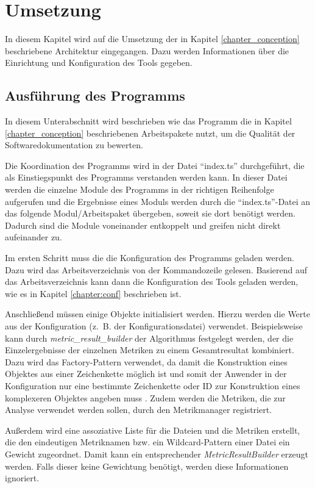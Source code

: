 \chapter{Umsetzung}\label{chapter:program}
In diesem Kapitel wird auf die Umsetzung der in Kapitel \ref{chapter_conception} beschriebene Architektur eingegangen. Dazu werden Informationen über die Einrichtung und Konfiguration des Tools gegeben.
\section{Ausführung des Programms}
In diesem Unterabschnitt wird beschrieben wie das Programm die in Kapitel \ref{chapter_conception}
beschriebenen Arbeitspakete nutzt, um die Qualität der Softwaredokumentation zu bewerten. 

Die Koordination des Programms wird in der Datei \enquote{index.ts} durchgeführt, die als Einstiegspunkt des Programms verstanden werden kann. In dieser Datei werden die einzelne Module des Programms in der richtigen Reihenfolge aufgerufen und die Ergebnisse eines Moduls werden durch die \enquote{index.ts}-Datei an das folgende Modul/Arbeitspaket übergeben, soweit sie dort benötigt werden. Dadurch sind die Module voneinander entkoppelt und greifen nicht direkt aufeinander zu. 

Im ersten Schritt  muss die die Konfiguration des Programms geladen werden. Dazu wird das Arbeitsverzeichnis von der Kommandozeile gelesen. Basierend auf das Arbeitsverzeichnis kann dann die Konfiguration des Tools geladen werden, wie es in Kapitel \ref{chapter:conf} beschrieben ist.  

Anschließend müssen einige Objekte  initialisiert werden. Hierzu werden die Werte aus der Konfiguration (z.~B. der Konfigurationsdatei) verwendet. Beispielsweise kann durch \textit{metric\_result\_builder} der Algorithmus festgelegt werden, der die Einzelergebnisse der einzelnen Metriken zu einem Gesamtresultat kombiniert. Dazu wird das Factory-Pattern verwendet, da damit die Konstruktion eines Objektes aus einer Zeichenkette möglich ist und somit der Anwender in der Konfiguration nur eine bestimmte Zeichenkette oder ID zur Konstruktion eines komplexeren Objektes angeben muss \cite[S. 149 1-161]{gamma2015design}. Zudem werden die Metriken, die zur Analyse verwendet werden sollen, durch den Metrikmanager registriert.

Außerdem wird eine assoziative Liste für die Dateien und die Metriken erstellt, die den eindeutigen Metriknamen bzw. ein Wildcard-Pattern einer Datei ein Gewicht zugeordnet. Damit kann ein entsprechender \textit{MetricResultBuilder} erzeugt werden. Falls dieser keine Gewichtung benötigt, werden diese Informationen ignoriert. 

